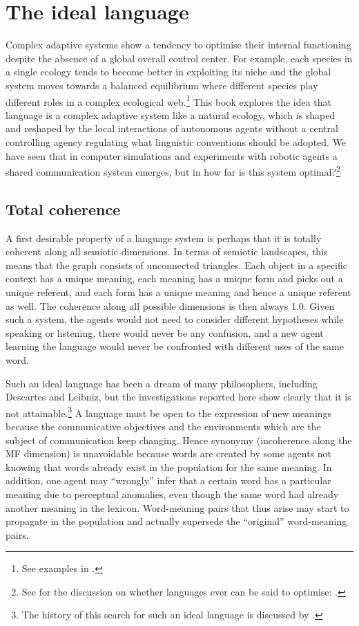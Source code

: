 \section{The ideal language}

Complex adaptive systems show a tendency to
optimise their internal functioning despite the absence of
a global overall control center. For example, 
each species in a single ecology tends to become 
better in exploiting its niche and the global system 
moves towards a balanced equilibrium where different
species play different roles in a complex ecological 
web.\footnote{See examples in \cite{Margulis:1991}.} This book explores the idea that language 
is a complex adaptive system like a natural ecology, 
which is shaped and 
reshaped by the local interactions of autonomous 
agents without a central controlling agency regulating
what linguistic conventions should be adopted. 
We have seen that in computer simulations and experiments
with robotic agents a shared communication system 
emerges, but in how far is this system optimal?\footnote{
See for the discussion on whether languages ever
can be said to optimise: \cite{Kirby:1999}.} 

\subsection{Total coherence}

A first desirable property of a language system 
is perhaps that it is totally coherent along all 
semiotic dimensions. 
In terms of semiotic landscapes, 
this means that the graph consists of unconnected triangles. 
Each object in a specific context has a unique
meaning, each meaning has a 
unique form and picks out a unique referent, and each form 
has a unique meaning and hence a unique referent as well. 
The coherence along all possible dimensions is then always
1.0. Given such a system, the agents would not need to
consider different hypotheses while speaking or listening, 
there would never be any confusion, and a new agent 
learning the language would never be confronted with 
different uses of the same word. 

Such an ideal language has been a dream of many 
philosophers, including Descartes and Leibniz, but 
the investigations reported here show clearly that 
it is not attainable.\footnote{The history of this search for such an ideal language
is discussed by \cite{Eco:1997}.}
A language must be open to the 
expression of new meanings because the communicative 
objectives and the environments which are the subject
of communication keep changing. Hence 
synonymy (incoherence along the MF dimension) is unavoidable
because words are created by some agents not knowing that 
words already exist in the population for the same meaning. 
In addition, one agent 
may ``wrongly'' infer that a certain word has a 
particular meaning due to perceptual anomalies, even though
the same word had already another meaning in the
lexicon. Word-meaning pairs that thus
arise may start to propagate 
in the population and actually supersede the ``original'' 
word-meaning pairs. 

